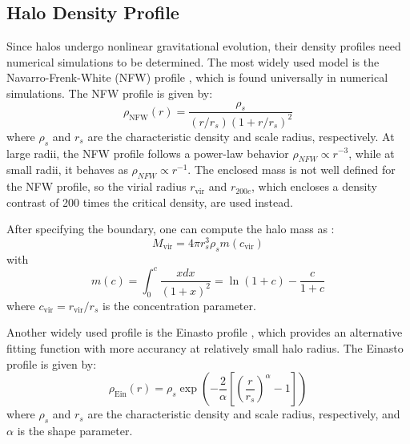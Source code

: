 \subsection{Halo Density Profile}
Since halos undergo nonlinear gravitational evolution, their density profiles need numerical simulations to be determined. The most widely used model is the Navarro-Frenk-White (NFW) profile \citep{1996ApJ...462..563N, 1997ApJ...490..493N}, which is found universally in numerical simulations. The NFW profile is given by:
\begin{equation}
    \rho_\text{NFW}(r) = \frac{\rho_s}{(r/r_s)(1 + r/r_s)^2}
\end{equation}
where $\rho_s$ and $r_s$ are the characteristic density and scale radius, respectively. At large radii, the NFW profile follows a power-law behavior $\rho_{NFW} \propto r^{-3}$, while at small radii, it behaves as $\rho_{NFW} \propto r^{-1}$. The enclosed mass is not well defined for the NFW profile, so the virial radius $r_{\text{vir}}$ and $r_{200c}$, which encloses a density contrast of 200 times the critical density, are used instead.

After specifying the boundary, one can compute the halo mass as \citep{2011MNRAS.414.1851O}:
\begin{equation}
    M_{\text{vir}} = 4\pi r_s^3 \rho_s m(c_{\text{vir}})
\end{equation}
with
\begin{equation}
    m(c) = \int_0^{c} \frac{x dx}{(1 + x)^2} = \ln(1 + c) - \frac{c}{1 + c}
\end{equation}
where $c_{\text{vir}} = r_{\text{vir}}/r_s$ is the concentration parameter. 

Another widely used profile is the Einasto profile \citep{1965TrAlm...5...87E}, which provides an alternative fitting function with more accurancy at relatively small halo radius. The Einasto profile is given by:
\begin{equation}
    \rho_{\text{Ein}}(r) = \rho_s \exp \left( -\frac{2}{\alpha} \left[ \left( \frac{r}{r_s} \right)^\alpha - 1 \right] \right)
\end{equation}
where $\rho_s$ and $r_s$ are the characteristic density and scale radius, respectively, and $\alpha$ is the shape parameter. 